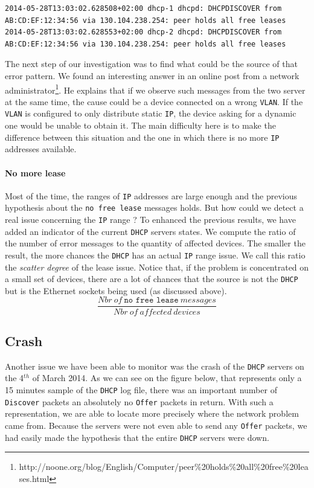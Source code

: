 \begin{lstlisting}[frame=single,breaklines=true,caption={Misleading Error Message}]
2014-05-28T13:03:02.628508+02:00 dhcp-1 dhcpd: DHCPDISCOVER from AB:CD:EF:12:34:56 via 130.104.238.254: peer holds all free leases
2014-05-28T13:03:02.628553+02:00 dhcp-2 dhcpd: DHCPDISCOVER from AB:CD:EF:12:34:56 via 130.104.238.254: peer holds all free leases
\end{lstlisting}


The next step of our investigation was to find what could be the source of that error pattern. We found an interesting answer in an online post from a network administrator\footnote{http://noone.org/blog/English/Computer/peer\%20holds\%20all\%20free\%20leases.html}. He explains that if we observe such messages from the two server at the same time, the cause could be a device connected on a wrong \texttt{VLAN}. If the \texttt{VLAN} is configured to only distribute static \texttt{IP}, the device asking for a dynamic one would be unable to obtain it. The main difficulty here is to make the difference between this situation and the one in which there is no more \texttt{IP} addresses available.


\paragraph*{No more lease} Most of the time, the ranges of \texttt{IP} addresses are large enough and the previous hypothesis about the \texttt{no free lease} messages holds. But how could we detect a real issue concerning the \texttt{IP} range ? To enhanced the previous results, we have added an indicator of the current \texttt{DHCP} servers states. We compute the ratio of the number of error messages to the quantity of affected devices. The smaller the result, the more chances the \texttt{DHCP} has an actual \texttt{IP} range issue. We call this ratio the \emph{scatter degree} of the lease issue. Notice that, if the problem is concentrated on a small set of devices, there are a lot of chances that the source is not the \texttt{DHCP} but is the Ethernet sockets being used (as discussed above).
\[ \frac{Nbr\ of\ \texttt{no free lease}\ messages}{Nbr\ of\ affected\ devices} \] 


\subsection{Crash}
Another issue we have been able to monitor was the crash of the \texttt{DHCP} servers on the 4$^{th}$ of March 2014. As we can see on the figure below, that represents only a 15 minutes sample of the \texttt{DHCP} log file, there was an important number of \texttt{Discover} packets an absolutely no \texttt{Offer} packets in return. With such a representation, we are able to locate more precisely where the network problem came from. Because the servers were not even able to send any \texttt{Offer} packets, we had easily made the hypothesis that the entire \texttt{DHCP} servers were down.

